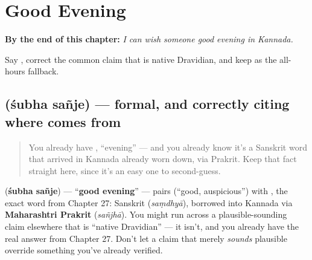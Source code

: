 
\chapter{Good Evening}
\label{ch:ka-good-evening}

\begin{chapteropening}
\textbf{By the end of this chapter:} \emph{I can wish someone good evening in Kannada.}

Say  , correct the common claim that  is native Dravidian, and keep  as the all-hours fallback.
\end{chapteropening}

\section[\texorpdfstring{\kn{ಶುಭ} \kn{ಸಂಜೆ} (śubha sañje)}{ಶುಭ ಸಂಜೆ (śubha sañje)}]{  (śubha sañje) — formal, and correctly citing where  comes from}

\label{lesson:KA-C30-shubha-sanje}



\begin{quote}
You already have , \textquotedblleft{}evening\textquotedblright{} — and you already know it's a Sanskrit word that arrived in Kannada already worn down, via Prakrit. Keep that fact straight here, since it's an easy one to second-guess.
\end{quote}

\begin{cousinweb}
\textbf{ } (\textbf{śubha sañje}) — \textquotedblleft{}\textbf{good evening}\textquotedblright{} — pairs \textbf{} (\textquotedblleft{}good, auspicious\textquotedblright{}) with \textbf{}, the exact word from Chapter 27: Sanskrit \textbf{} (\emph{saṃdhyā}), borrowed into Kannada via \textbf{Maharashtri Prakrit}  (\emph{sañjhā}). You might run across a plausible-sounding claim elsewhere that  is \textquotedblleft{}native Dravidian\textquotedblright{} — it isn't, and you already have the real answer from Chapter 27. Don't let a claim that merely \emph{sounds} plausible override something you've already verified.
\end{cousinweb}

